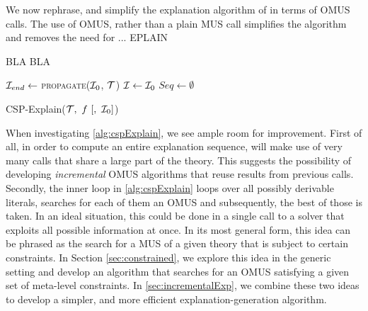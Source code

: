 
We now rephrase, and simplify the explanation algorithm of \citet{ecai/BogaertsGCG20} in terms of OMUS calls. The use of OMUS, rather than a plain MUS call simplifies the algorithm and removes the need for ... EPLAIN

BLA BLA 



\begin{algorithm}
    \DontPrintSemicolon
    $\mathcal{I}_{end} \gets$ \textsc{propagate($\mathcal{I}_0$, $\mathcal{T}$)} \;
    $\mathcal{I} \gets \mathcal{I}_0$  \;
    $Seq \gets \emptyset$  \;
  \caption{CSP-Explain($\m{T} ,\ f \ [,  \ \m{I}_0 ]$)}
  \label{alg:cspExplain}
\end{algorithm}




When investigating \cref{alg:cspExplain}, we see ample room for improvement. 
First of all, in order to compute an entire explanation sequence, \label{alg:cspExplain} will make use of very many \omus calls that share a large part of the theory. 
This suggests the possibility of developing \emph{incremental} OMUS algorithms that reuse results from previous calls. 
Secondly, the inner loop in \cref{alg:cspExplain} loops over all possibly derivable  literals, searches for each of them an OMUS and subsequently, the best of those is taken. 
In an ideal situation, this could be done in a single call to a solver that exploits all possible information at once. 
In its most general form, this idea can be phrased as the search for a MUS of a given theory that is subject to certain constraints. 
In Section \ref{sec:constrained}, we explore this idea in the generic setting and develop an algorithm that searches for an OMUS satisfying a given set of meta-level constraints. 
In \cref{sec:incrementalExp}, we combine these two ideas to develop a simpler, and more efficient explanation-generation algorithm. 
